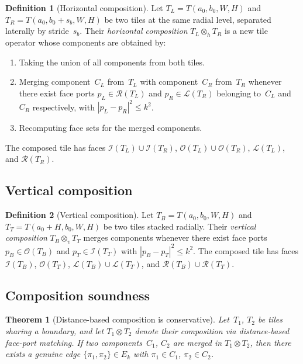 \documentclass[11pt,a4paper]{article}
\newcommand{\fI}{\mathcal{I}}
\newcommand{\fO}{\mathcal{O}}
\newcommand{\fL}{\mathcal{L}}
\newcommand{\fR}{\mathcal{R}}
\theoremstyle{definition}
\newtheorem{definition}{Definition}[section]
\theoremstyle{plain}
\newtheorem{theorem}{Theorem}[section]
\theoremstyle{remark}
\begin{document}
\begin{definition}[Horizontal composition]\label{def:h-composition}
Let $T_L = T(a_0, b_0, W, H)$ and $T_R = T(a_0, b_0 + s_b, W, H)$ be two tiles at the same radial level, separated laterally by stride~$s_b$.  Their \emph{horizontal composition} $T_L \otimes_h T_R$ is a new tile operator whose components are obtained by:
\begin{enumerate}
  \item Taking the union of all components from both tiles.
  \item Merging component~$C_L$ from~$T_L$ with component~$C_R$ from~$T_R$ whenever there exist face ports $p_L \in \fR(T_L)$ and $p_R \in \fL(T_R)$ belonging to~$C_L$ and~$C_R$ respectively, with $|p_L - p_R|^2 \le k^2$.
  \item Recomputing face sets for the merged components.
\end{enumerate}
The composed tile has faces $\fI(T_L) \cup \fI(T_R)$, $\fO(T_L) \cup \fO(T_R)$, $\fL(T_L)$, and $\fR(T_R)$.
\end{definition}

\subsection{Vertical composition}

\begin{definition}[Vertical composition]\label{def:v-composition}
Let $T_B = T(a_0, b_0, W, H)$ and $T_T = T(a_0 + H, b_0, W, H)$ be two tiles stacked radially.  Their \emph{vertical composition} $T_B \otimes_v T_T$ merges components whenever there exist face ports $p_B \in \fO(T_B)$ and $p_T \in \fI(T_T)$ with $|p_B - p_T|^2 \le k^2$.  The composed tile has faces $\fI(T_B)$, $\fO(T_T)$, $\fL(T_B) \cup \fL(T_T)$, and $\fR(T_B) \cup \fR(T_T)$.
\end{definition}

\subsection{Composition soundness}

\begin{theorem}[Distance-based composition is conservative]\label{thm:composition-sound}
Let~$T_1$, $T_2$ be tiles sharing a boundary, and let $T_1 \otimes T_2$ denote their composition via distance-based face-port matching.  If two components~$C_1$, $C_2$ are merged in $T_1 \otimes T_2$, then there exists a genuine edge $\{\pi_1, \pi_2\} \in E_k$ with $\pi_1 \in C_1$, $\pi_2 \in C_2$.
\end{theorem}
\end{document}
